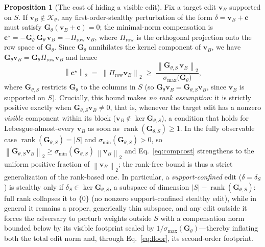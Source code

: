 \documentclass[11pt]{article}
\newcommand{\norm}[1]{\left\lVert #1 \right\rVert}
\theoremstyle{definition}
\newtheorem{proposition}{Proposition}
\begin{document}
\begin{proposition}[The cost of hiding a visible edit]
\label{prop:comp}
Fix a target edit $\bm{v}_B$ supported on $S$. If $\bm{v}_B \notin
\mathcal{K}_\theta$, any first-order-stealthy perturbation of the form
$\delta = \bm{v}_B + \bm{c}$ must satisfy $\bm{G}_\theta(\bm{v}_B + \bm{c}) =
0$; the minimal-norm compensation is $\bm{c}^\star = -\bm{G}_\theta^{+}
\bm{G}_\theta\,\bm{v}_B = -\Pi_{\mathrm{row}}\,\bm{v}_B$, where
$\Pi_{\mathrm{row}}$ is the orthogonal projection onto the row space of
$\bm{G}_\theta$. Since $\bm{G}_\theta$ annihilates the kernel component of
$\bm{v}_B$, we have $\bm{G}_\theta\bm{v}_B =
\bm{G}_\theta\Pi_{\mathrm{row}}\bm{v}_B$ and hence
\begin{equation}
  \norm{\bm{c}^\star}_2
  \;=\; \norm{\Pi_{\mathrm{row}}\bm{v}_B}_2
  \;\ge\; \frac{\norm{\bm{G}_{\theta,S}\,\bm{v}_B}_2}
                 {\sigma_{\max}\!\big(\bm{G}_\theta\big)},
  \label{eq:compcost}
\end{equation}
where $\bm{G}_{\theta,S}$ restricts $\bm{G}_\theta$ to the columns in $S$ (so
$\bm{G}_\theta\bm{v}_B = \bm{G}_{\theta,S}\bm{v}_B$, since $\bm{v}_B$ is
supported on $S$). Crucially, this bound makes \emph{no rank assumption}: it is
strictly positive exactly when $\bm{G}_{\theta,S}\bm{v}_B \ne 0$, that is,
whenever the target edit has a nonzero \emph{visible} component within its block
($\bm{v}_B \notin \ker \bm{G}_{\theta,S}$), a condition that holds for
Lebesgue-almost-every $\bm{v}_B$ as soon as
$\operatorname{rank}(\bm{G}_{\theta,S}) \ge 1$. In the fully observable case
$\operatorname{rank}(\bm{G}_{\theta,S}) = |S|$ and
$\sigma_{\min}(\bm{G}_{\theta,S}) > 0$, so
$\norm{\bm{G}_{\theta,S}\bm{v}_B}_2 \ge
\sigma_{\min}(\bm{G}_{\theta,S})\,\norm{\bm{v}_B}_2$ and
Eq.~\eqref{eq:compcost} strengthens to the uniform positive fraction of
$\norm{\bm{v}_B}_2$; the rank-free bound is thus a strict generalization of the
rank-based one. In particular, a \emph{support-confined} edit
($\delta = \delta_S$) is stealthy only if $\delta_S \in \ker
\bm{G}_{\theta,S}$, a subspace of dimension $|S| -
\operatorname{rank}(\bm{G}_{\theta,S})$: full rank collapses it to $\{0\}$ (no
nonzero support-confined stealthy edit), while in general it remains a proper,
generically thin subspace, and any edit outside it forces the adversary to
perturb weights outside $S$ with a compensation norm bounded below by its
visible footprint scaled by $1/\sigma_{\max}(\bm{G}_\theta)$---thereby inflating
both the total edit norm and, through Eq.~\eqref{eq:floor}, its second-order
footprint.
\end{proposition}
\end{document}
